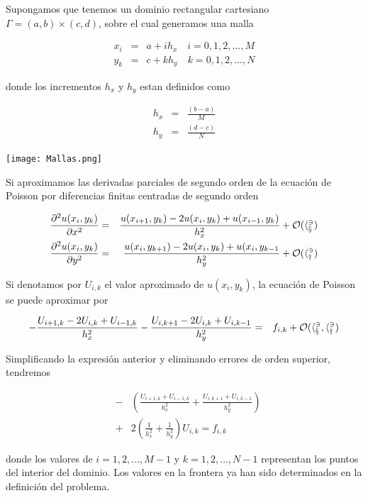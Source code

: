 \documentclass[12pt]{article}
\begin{document}
Supongamos que tenemos un dominio rectangular cartesiano $\Gamma = (a,b) \times (c,d)$, sobre el cual generamos una malla 

\begin{eqnarray*}
x_i & = & a + i h_x \quad i={0,1,2,\ldots, M} \\
y_k & = & c + k h_y \quad k={0,1,2,\ldots, N}
\end{eqnarray*}

donde los incrementos $h_x$ y $h_y$ estan definidos como 

\begin{eqnarray*}
h_x & = & \frac{(b-a)}{M} \\
h_y & = & \frac{(d-c)}{N}
\end{eqnarray*}

\begin{center}
    \texttt{[image: Mallas.png]}
\end{center}

Si aproximamos las derivadas parciales de segundo orden de la ecuación de Poisson por diferencias finitas centradas de segundo orden

\begin{eqnarray*}
\frac{\partial^2 u(x_i, y_k)}{\partial x^2} & = & 
\frac{u(x_{i+1},y_k) - 2 u(x_i,y_k) + u(x_{i-1},y_k)}{h_x^2} + \cal{O}(h_x^3) \\
\frac{\partial^2 u(x_i, y_k)}{\partial y^2} & = & 
\frac{u(x_i,y_{k+1}) - 2 u(x_i,y_k) + u(x_i,y_{k-1}}{h_y^2} + \cal{O}(h_y^3) \\
\end{eqnarray*}

Si denotamos por $U_{i,k}$ el valor aproximado de $u(x_i, y_k)$, la ecuación de Poisson se puede aproximar por

\begin{eqnarray*}
- \frac{U_{i+1,k} - 2 U_{i,k} + U_{i-1,k}}{h_x^2}
- \frac{U_{i,k+1} - 2 U_{i,k} + U_{i,k-1}}{h_y^2}
& = & f_{i,k} + \cal{O}(h_x^3,h_y^3)
\end{eqnarray*}

Simplificando la expresión anterior y eliminando errores de orden superior, tendremos

\begin{eqnarray*}
 & - & \left( \frac{U_{i+1,k}+ U_{i-1,k}}{h_x^2}
+ \frac{U_{i,k+1} + U_{i,k-1}}{h_y^2} \right)  \\ 
& + & 2 \left( \frac{1}{h_x^2} + \frac{1}{h_y^2}\right) U_{i,k} = f_{i,k}
\end{eqnarray*}

donde los valores de $i={1,2,\ldots,M-1}$ y $k={1,2,\ldots,N-1}$ representan los puntos del interior del dominio. Los valores en la frontera ya han sido determinados en la definición del problema.
\end{document}
